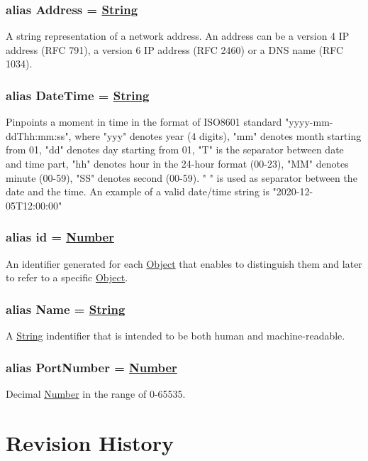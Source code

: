 \documentclass[a4paper]{arrowhead}
\newcommand{\pdef}[1]{{\textcolor{ArrowheadGrey}{#1 \label{sec:model:primitives:#1} \label{sec:model:primitives:#1s}}}}
\newcommand{\pref}[1]{{\textcolor{ArrowheadGrey}{\hyperref[sec:model:primitives:#1]{#1}}}}
\begin{document}
\subsubsection{alias \pdef{Address} = \pref{String}}

A string representation of a network address. An address can be a version 4 IP address (RFC 791), a version 6 IP address (RFC 2460) or a DNS name (RFC 1034).

\subsubsection{alias \pdef{DateTime} = \pref{String}}

Pinpoints a moment in time in the format of ISO8601 standard "yyyy-mm-ddThh:mm:ss", where "yyy" denotes year (4 digits), "mm" denotes month starting from 01, "dd" denotes day starting from 01, "T" is the separator between date and time part, "hh" denotes hour in the 24-hour format (00-23), "MM" denotes minute (00-59), "SS" denotes second (00-59). " " is used as separator between the date and the time.
An example of a valid date/time string is "2020-12-05T12:00:00"

\subsubsection{alias \pdef{id} = \pref{Number}}

An identifier generated for each \pref{Object} that enables to distinguish them and later to refer to a specific \pref{Object}.

\subsubsection{alias \pdef{Name} = \pref{String}}

A \pref{String} indentifier that is intended to be both human and machine-readable.

\subsubsection{alias \pdef{PortNumber} = \pref{Number}}

Decimal \pref{Number} in the range of 0-65535.

\newpage




\newpage

\section{Revision History}
\end{document}
